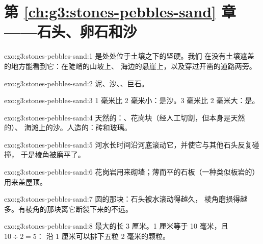 \section*{第 \ref{ch:g3:stones-pebbles-sand} 章——石头、卵石和沙}

\begin{solution}{exo:g3:stones-pebbles-sand:1}
是处处位于土壤之下的坚硬。我们
在没有土壤遮盖的地方能看到它：在陡峭的山坡上、
海边的悬崖上，以及穿过开凿的道路两旁。
\end{solution}

\begin{solution}{exo:g3:stones-pebbles-sand:2}
泥、沙、、巨石。
\end{solution}

\begin{solution}{exo:g3:stones-pebbles-sand:3}
1 毫米比 2 毫米小：是沙。3 毫米比
2 毫米大：是。
\end{solution}

\begin{solution}{exo:g3:stones-pebbles-sand:4}
天然的：、花岗块（经人工切割，但本身是天然的）、
海滩上的沙。人造的：砖和玻璃。
\end{solution}

\begin{solution}{exo:g3:stones-pebbles-sand:5}
河水长时间沿河底滚动它，并使它与其他石头反复碰撞，
于是棱角被磨平了。
\end{solution}

\begin{solution}{exo:g3:stones-pebbles-sand:6}
花岗岩用来砌墙；薄而平的石板（一种类似板岩的）用来盖屋顶。
\end{solution}

\begin{solution}{exo:g3:stones-pebbles-sand:7}
圆的那块：石头被水滚动得越久，
棱角磨损得越多。有棱角的那块离它断裂下来的不远。
\end{solution}

\begin{solution}{exo:g3:stones-pebbles-sand:8}
最大的长 3 厘米。1 厘米等于 10
毫米，且 $10 \div 2 = 5$：
沿 1 厘米可以排下五粒 2 毫米的颗粒。
\end{solution}

